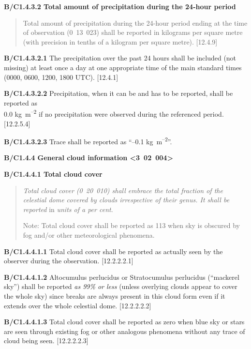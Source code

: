 \textbf{B/C1.4.3.2 Total amount of precipitation during the 24-hour period}

\begin{quote}
Total amount of precipitation during the 24-hour period ending at the time of observation (0~13~023) shall be reported in kilograms per square metre (with precision in tenths of a kilogram per square metre). {[}12.4.9{]}
\end{quote}

\textbf{B/C1.4.3.2.1} The precipitation over the past 24 hours shall be included (not missing) at least once a day at one appropriate time of the main standard times (0000, 0600, 1200, 1800 UTC). {[}12.4.1{]}

\textbf{B/C1.4.3.2.2} Precipitation, when it can be and has to be reported, shall be reported as\\
0.0 kg\emph{~}m\textsuperscript{--2} if no precipitation were observed during the referenced period. {[}12.2.5.4{]}

\textbf{B/C1.4.3.2.3} Trace shall be reported as ``--0.1 kg~m\textsuperscript{--2}''.

\textbf{B/C1.4.4 General cloud information \textless3~02~004\textgreater{}}

\textbf{B/C1.4.4.1 Total cloud cover}

\begin{quote}
\emph{Total cloud cover (0~20~010) shall embrace the total fraction of the celestial dome covered by clouds irrespective of their genus. It shall be reported} in \emph{units of a per cent}.

Note: Total cloud cover shall be reported as 113 when sky is obscured by fog and/or other meteorological phenomena.
\end{quote}

\textbf{B/C1.4.4.1.1} Total cloud cover shall be reported as actually seen by the observer during the observation. {[}12.2.2.2.1{]}

\textbf{B/C1.4.4.1.2} Altocumulus perlucidus or Stratocumulus perlucidus (``mackerel sky'') shall be reported \emph{as 99\% or less} (unless overlying clouds appear to cover the whole sky) since breaks are always present in this cloud form even if it extends over the whole celestial dome. {[}12.2.2.2.2{]}

\textbf{B/C1.4.4.1.3} Total cloud cover shall be reported as zero when blue sky or stars are seen through existing fog or other analogous phenomena without any trace of cloud being seen. {[}12.2.2.2.3{]}

